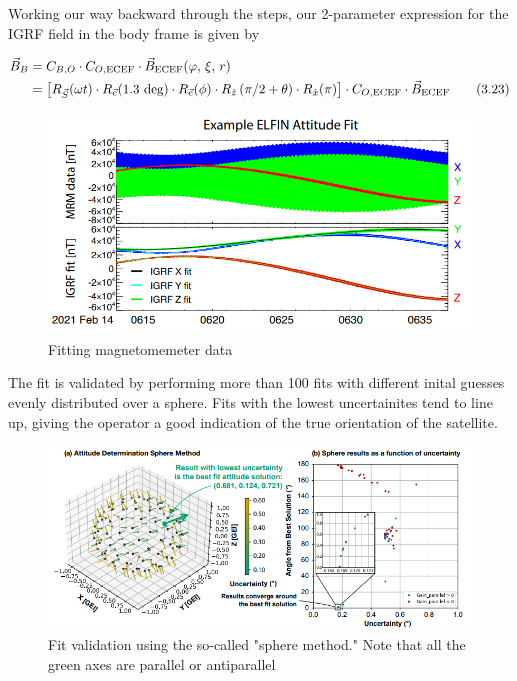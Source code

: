 \documentclass{article}
\begin{document}
Working our way backward through the steps, our 2-parameter expression for the IGRF field in the body frame is given by 

\begin{alignat}{1}
	\vec{B}_{B} &= C_{B,O} \cdot C_{O, \text{ECEF}} \cdot \vec{B}_{\text{ECEF}} (\varphi, \, \xi, \, r) \notag \\
	& = \left[ R_{\vec{S}}(\omega t) \cdot R_{\vec{e}}(1.3 \text{ deg}) \cdot R_{\vec{e}}(\phi) \cdot R_{\hat{z}}\left(\pi/2+\theta\right) \cdot R_{\hat{x}}(\pi) \right] \cdot C_{O,\text{ECEF}} \cdot \vec{B}_{\text{ECEF}} \tag{3.23}
\end{alignat}

\begin{figure}[H]
    \centering
    \includegraphics[width=1\textwidth]{IGRF Fit.png}
    \caption{Fitting magnetomemeter data \cite{tsai}}
    \label{fig:enter-label}
\end{figure}

The fit is validated by performing more than 100 fits with different inital guesses evenly distributed over a sphere. Fits with the lowest uncertainites tend to line up, giving the operator a good indication of the true orientation of the satellite.

\begin{figure}[H]
    \centering
    \includegraphics[width=1\textwidth]{IGRF Fit 2.png}
    \caption{Fit validation using the so-called "sphere method." Note that all the green axes are parallel or antiparallel \cite{tsai}}
    \label{fig:enter-label}
\end{figure}
\end{document}
